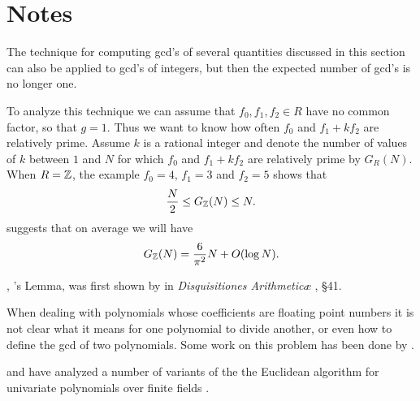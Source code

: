 \section*{Notes}

\small

 The technique for computing {\sc gcd}'s
of several quantities discussed in this section can also be applied to
{\sc gcd}'s of integers, but then the expected number of {\sc gcd}'s
is no longer one.

To analyze this technique we can assume
that $f_0, f_1, f_2 \in R$ have no common factor, so that $g=1$.  Thus
we want to know how often $f_0$ and $f_1 + k f_2$ are relatively
prime.  Assume $k$ is a rational integer and denote the number of
values of $k$ between $1$ and $N$ for which $f_0$ and $f_1+k f_2$ are
relatively prime by $G_R(N)$.  When $R = \mathbb{Z}$, the example $f_0 = 4$,
$f_1 = 3$ and $f_2=5$ shows that
\[
\frac{N}{2} \le G_{\mathbb{Z}}(N) \le N.
\]
 suggests that on average we will have
\[
G_{\mathbb{Z}}(N) = \frac{6}{\pi^2} N + O(\log N).
\]

, {\Gauss}'s Lemma, was first shown by
{\Gauss} in {\em Disquisitiones Arithmetic\ae}
\cite{Gauss:Disquisitiones}, \S41. 

  When dealing with polynomials whose
coefficients are floating point numbers it is not clear what it means
for one polynomial to divide another, or even how to define the {\sc
gcd} of two polynomials.  Some work on this problem has been done by
{\Schoenhage} \cite{Schonhage85}.

{\Ma} and {\Gathen} have analyzed a number of variants of the the
Euclidean algorithm for univariate polynomials over finite fields
\cite{Ma90}. 

\normalsize

